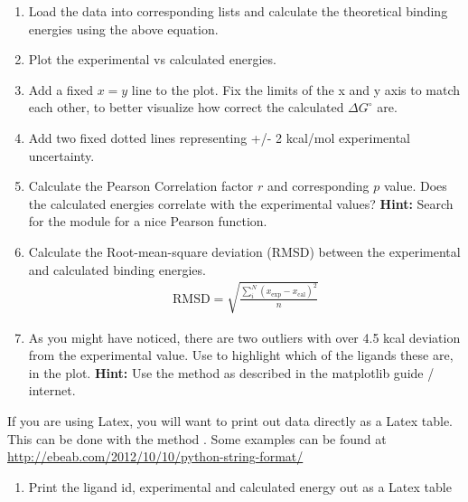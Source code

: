 \documentclass{article}
\begin{document}
\begin{enumerate}

    \item Load the data into corresponding lists and calculate the theoretical binding energies using the above equation.

    \item Plot the experimental vs calculated energies.

    \item Add a fixed $x = y$ line to the plot.
        Fix the limits of the x and y axis to match each other, to better visualize how correct the calculated $\Delta G^\circ$ are.

    \item Add two fixed dotted lines representing +/- 2 kcal/mol experimental uncertainty. 

    \item Calculate the Pearson Correlation factor $r$ and corresponding $p$ value.
        Does the calculated energies correlate with the experimental values?
        {\bf Hint:} Search for the  module for a nice Pearson function.

    \item Calculate the Root-mean-square deviation (RMSD) between the experimental and calculated binding energies.
    \begin{align}
        \mathrm{RMSD} = \sqrt{\frac{\sum_i^N (x_{\mathrm{exp}}-x_{\mathrm{cal}})^2 }{n}}
    \end{align}

    \item As you might have noticed, there are two outliers with over 4.5 kcal deviation from the experimental value.
        Use  to highlight which of the ligands these are, in the plot.
        {\bf Hint:} Use the method  as described in the matplotlib guide / internet.

\end{enumerate}

\newpage


If you are using Latex, you will want to print out data directly as a Latex table.
This can be done with the method .
Some examples can be found at \href{http://ebeab.com/2012/10/10/python-string-format/}{http://ebeab.com/2012/10/10/python-string-format/}

\begin{enumerate}[resume]

    \item Print the ligand id, experimental and calculated energy out as a Latex table

\end{enumerate}
\end{document}
